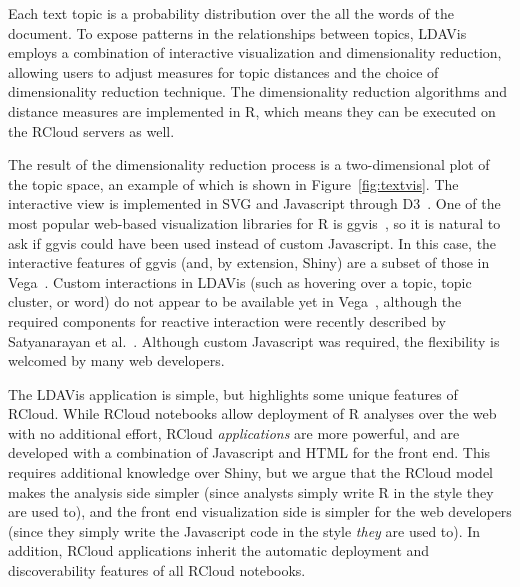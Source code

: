 Each text topic is a probability distribution over the all the
words of the document. To expose patterns in the relationships
between topics, LDAVis employs a combination of
interactive visualization and dimensionality reduction,
allowing users to adjust measures for topic distances and the choice
of dimensionality reduction technique. The dimensionality reduction
algorithms and distance measures are implemented in R, which
means they can be executed on the RCloud servers as well.

The result of the dimensionality reduction process is a
two-dimensional plot of the topic space, an example of which is shown in
Figure~\ref{fig:textvis}. The interactive view is implemented in SVG
and Javascript through D3~\cite{Bostock:2011:DDD}. One of the most
popular web-based visualization libraries for R is ggvis~\cite{ggvis},
so it is natural to ask if ggvis could have been used instead of
custom Javascript. In this case, the interactive features of ggvis
(and, by extension, Shiny) are a subset of those in Vega~\cite{vega}.
Custom interactions in LDAVis (such as hovering over a topic,
topic cluster, or word) do not appear to be available yet in Vega~\cite{vega},
although the required components for reactive interaction were
recently described by Satyanarayan et
al.~\cite{Satyanarayan:2014:DID}.
Although custom Javascript was required, the flexibility is welcomed
by many web developers.

The LDAVis application is simple, but highlights some unique features
of RCloud. While RCloud notebooks allow deployment of R analyses over
the web with no additional effort, RCloud \emph{applications} are more
powerful, and are developed with a combination of Javascript and HTML
for the front end. This requires additional knowledge over Shiny, but
we argue that the RCloud model makes the analysis side simpler 
(since analysts simply write R in the style they are used to),
and the front end visualization side is simpler for the web
developers (since they simply write the Javascript code in
the style \emph{they} are used to). In addition, RCloud applications
inherit the automatic deployment and discoverability features of
all RCloud notebooks.



